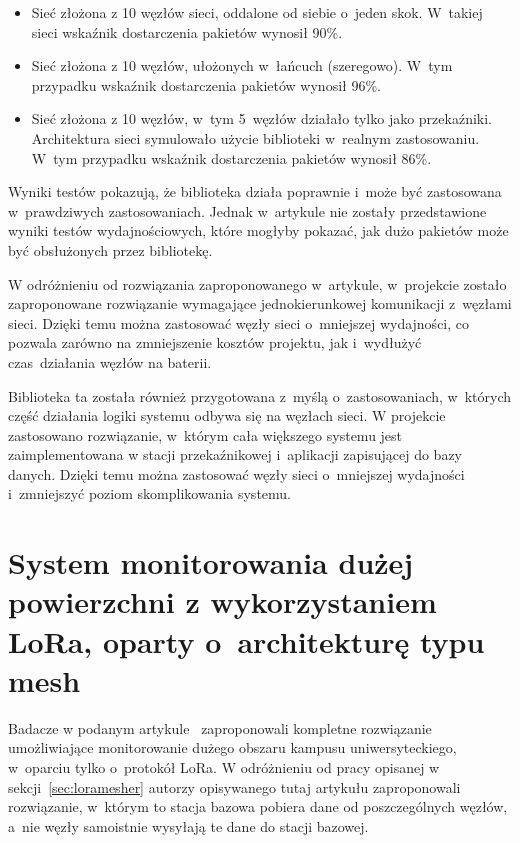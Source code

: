 \begin{itemize}
    \item Sieć złożona z 10 węzłów sieci, oddalone od siebie o~jeden skok. W~takiej sieci wskaźnik dostarczenia pakietów wynosił 90\%.
    \item Sieć złożona z 10 węzłów, ułożonych w~łańcuch (szeregowo). W~tym przypadku wskaźnik dostarczenia pakietów wynosił 96\%.
    \item Sieć złożona z 10 węzłów, w~tym 5~węzłów działało tylko jako przekaźniki. Architektura sieci symulowało użycie biblioteki w~realnym zastosowaniu. W~tym przypadku wskaźnik dostarczenia pakietów wynosił 86\%.
\end{itemize}

Wyniki testów pokazują, że biblioteka działa poprawnie i~może być zastosowana w~prawdziwych zastosowaniach.
Jednak w~artykule nie zostały przedstawione wyniki testów wydajnościowych, które mogłyby pokazać, jak dużo pakietów może być obsłużonych przez bibliotekę.

W odróżnieniu od rozwiązania zaproponowanego w~artykule, w~projekcie zostało zaproponowane rozwiązanie wymagające jednokierunkowej komunikacji z~węzłami sieci.
Dzięki temu można zastosować węzły sieci o~mniejszej wydajności, co pozwala zarówno na zmniejszenie kosztów projektu, jak i~wydłużyć czas~działania węzłów na baterii.

Biblioteka ta została również przygotowana z~myślą o~zastosowaniach, w~których część działania logiki systemu odbywa się na węzłach sieci.
W projekcie zastosowano rozwiązanie, w~którym cała większego systemu jest zaimplementowana w stacji przekaźnikowej i~aplikacji zapisującej do bazy danych.
Dzięki temu można zastosować węzły sieci o~mniejszej wydajności i~zmniejszyć poziom skomplikowania systemu.

\section{System monitorowania dużej powierzchni z wykorzystaniem LoRa, oparty o~architekturę typu mesh}

Badacze w podanym artykule~\cite{bib:loramesh-lee} zaproponowali kompletne rozwiązanie umożliwiające monitorowanie dużego obszaru kampusu uniwersyteckiego, w~oparciu tylko o~protokół LoRa.
W odróżnieniu od pracy opisanej w sekcji~\ref{sec:loramesher} autorzy opisywanego tutaj artykułu zaproponowali rozwiązanie, w~którym to stacja bazowa pobiera dane od poszczególnych węzłów, a~nie węzły samoistnie wysyłają te dane do stacji bazowej.


